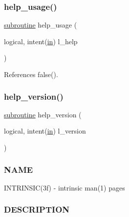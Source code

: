 \subsubsection{\texorpdfstring{help\+\_\+usage()}{help\_usage()}}
{\footnotesize\ttfamily \hyperlink{M__stopwatch_83_8txt_acfbcff50169d691ff02d4a123ed70482}{subroutine} help\+\_\+usage (\begin{DoxyParamCaption}\item[{logical, intent(\hyperlink{M__journal_83_8txt_afce72651d1eed785a2132bee863b2f38}{in})}]{l\+\_\+help }\end{DoxyParamCaption})}



References false().

\mbox{\label{intrinsics_8f90_a39c21619b08a3c22f19e2306efd7f766}} 
\subsubsection{\texorpdfstring{help\+\_\+version()}{help\_version()}}
{\footnotesize\ttfamily \hyperlink{M__stopwatch_83_8txt_acfbcff50169d691ff02d4a123ed70482}{subroutine} help\+\_\+version (\begin{DoxyParamCaption}\item[{logical, intent(\hyperlink{M__journal_83_8txt_afce72651d1eed785a2132bee863b2f38}{in})}]{l\+\_\+version }\end{DoxyParamCaption})}



\subsubsection*{N\+A\+ME}

I\+N\+T\+R\+I\+N\+S\+I\+C(3f) -\/ intrinsic man(1) pages 

\subsubsection*{D\+E\+S\+C\+R\+I\+P\+T\+I\+ON}

